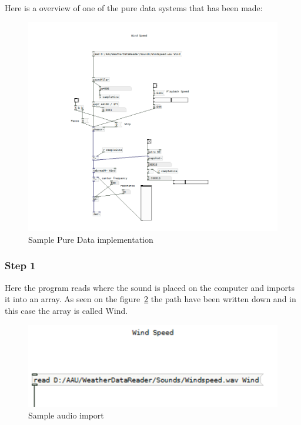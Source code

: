 Here is a overview of one of the pure data systems that has been made:

\begin{figure}[!htbp]
    \centering
    \includegraphics[width=1\textwidth]{images/Implementation1.png}
    \caption{Sample Pure Data implementation}
    \label{fig:implementation1}
\end{figure}

\FloatBarrier
\subsubsection*{Step 1} %
\label{ssub:step_1}

Here the program reads where the sound is placed on the computer and imports it into an array. 
As seen on the figure~\ref*{fig:implementation2} the path have been written down and in this case the array is called Wind.

\begin{figure}[!htbp]
    \centering
    \includegraphics[width=.7\textwidth]{images/Implementation2.png}
    \caption{Sample audio import}
    \label{fig:implementation2}
\end{figure}

